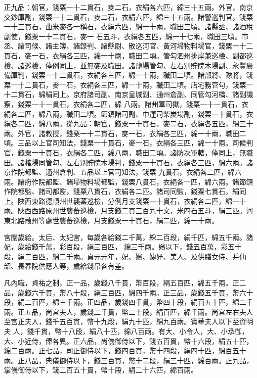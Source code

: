 \begin{pinyinscope}
 正九品：朝官，錢粟一十二貫石，麥二石，衣絹各六匹，綿三十五兩。外官，南京交鈔庫副，錢粟一十二貫石，麥二石，衣絹六匹，綿三十五兩。諸警巡判官，錢粟一十三貫石，曲米麥各一稱石，衣絹六匹，綿一十兩，職田三頃。諸縣丞、諸酒稅副使，錢粟一十二貫石，麥一
 石五斗，衣絹各五匹，綿一十七兩，職田三頃。市丞、諸司候、諸主簿、諸錄判、諸縣尉、散巡河官、黃河埽物料場官，錢粟一十二貫石，麥一石，衣絹各三匹，綿一十兩，職田二頃。管勾泗州排岸兼巡檢、副都巡檢、諸巡檢，俸例同上，並無麥及職田。諸鹽場管勾、左右別貯院木場副、永豐廣備庫判，錢粟一十二貫石，衣絹各三匹，綿一十兩，職田二頃。諸部將、隊將，錢粟一十二貫石，麥一石，衣絹各三匹，綿一十兩，職田二頃。店宅務管勾，錢粟一十二貫石，綿絹同上。京府諸司副、南京皇城副、通州倉副、同管勾河橋、諸副譏察，錢粟一十一貫石，衣絹各二匹，綿
 八兩。諸州軍司獄，錢粟一十一貫石，衣絹各二匹，綿八兩，職田二頃。節鎮諸司副、中運司柴炭場副，錢粟一十貫石，衣絹各二匹，綿八兩。從九品：朝官，錢粟一十貫石，麥二石，衣絹各五匹，綿三十兩。外官，諸教授，錢粟一十二貫石，麥一石，衣絹各三匹，綿一十兩，職田二頃。三品以上官司知法，錢粟一十貫石，麥一石，衣絹各三匹，綿一十兩。司候判官，錢粟一十貫石，衣絹各二匹，綿八兩，職田二頃。諸防次軍轄，俸同上，無職田。諸榷場同管勾、左右別貯院木場判，錢粟一十貫石，衣絹各三匹，綿六兩。諸京作院都監、通州倉判、五品以上官司知法，錢粟
 九貫石，衣絹各二匹，綿六兩。諸府作院都監、諸埽物料場都監，錢粟八貫石，衣絹各一匹，綿六兩。諸節鎮作院都監、諸司都監，錢粟八貫石，衣絹各二匹。諸司同監，錢粟七貫石，絹同上。陜西東路德順州世襲蕃巡檢，分例月支錢粟一十貫石，衣絹各二匹，綿一十兩。陜西西路原州世襲蕃巡檢，月支錢二貫三百九十文，米四石五斗，絹三匹。河東北路葭州等處世襲蕃巡檢，月支錢粟一十貫石，絹二匹，綿一十兩。



 宮闈歲給。太后、太妃宮，每歲各給錢二千萬，綵二百段，絹千匹，綿五千兩。諸妃，歲給錢千萬，彩百段，絹三百匹，
 綿三千兩。嬪以下，錢五百萬，彩五十段，絹二百匹，綿二千兩。貞元元年，妃、嬪、婕妤、美人、及供膳女侍、并仙韶、長春院供應人等，歲給錢帛各有差。



 凡內職，貞祐之制，正一品，歲錢八千貫，幣百段，絹五百匹，綿五千兩。正二品，歲錢六千貫，幣八十段，絹三百匹，綿四千兩。正三品，歲錢五千貫，幣六十段，絹二百匹，綿三千兩。正四品，歲錢四千貫，幣四十段，絹百五十匹，綿二千兩。正五品，尚宮夫人，歲錢二千貫，幣二十段，絹百匹，綿千兩。尚宮左右夫人至宮正夫人，錢千五百貫，幣十九段，絹九十匹，綿九百兩。寶華夫人以下至資明夫
 人，錢千貫，幣十八段，絹八十匹，綿八百兩。有大、小令人，大、小承御，大、小近侍，俸各異。正六品，尚儀御侍以下，錢五百貫，幣十六段，絹五十匹，綿二百兩。正七品，司正御侍以下，錢四百貫，幣十四段，絹四十匹，綿百五十兩。正八品，典儀御侍以下，錢三百貫，幣十二段，絹三十匹，綿百兩。正九品，掌儀御侍以下，錢二百五十貫，幣十段，絹二十六匹，綿百兩。




\end{pinyinscope}
